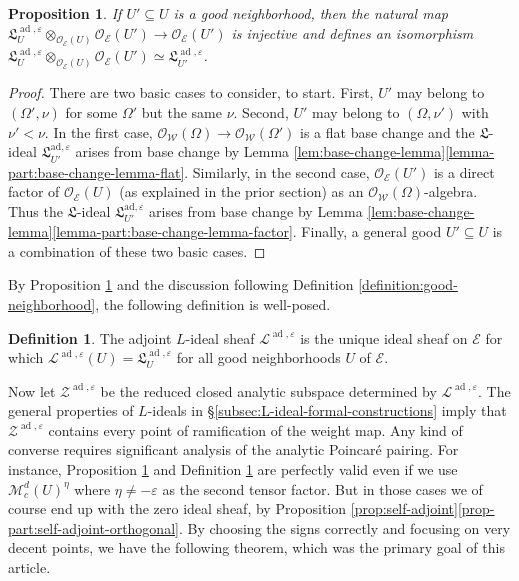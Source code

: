 \documentclass[10pt, twoside]{amsart}
\theoremstyle{plain}
\newtheorem{proposition}[theorem]{Proposition}
\theoremstyle{definition}
\newtheorem{definition}[theorem]{Definition}
\theoremstyle{remark}
\numberwithin{equation}{subsection}
\def\ad{\operatorname{ad}}
\def\gL{\mathfrak L}
\def\scro{\mathscr O}
\def\scre{\mathscr E}
\def\scrl{\mathscr L}
\def\scro{\mathscr O}
\def\scrw{\mathscr W}
\def\scrz{\mathscr{Z}}
\def\scrm{\mathscr{M}}
\begin{document}
\begin{proposition}\label{prop:base-change-Lideals}
If $U' \subseteq U$ is a good neighborhood, then the natural map $\gL_U^{\ad,\varepsilon}\otimes_{\scro_{\scre}(U)} \scro_{\scre}(U') \rightarrow \scro_{\scre}(U')$ is injective and defines an isomorphism $\gL^{\ad,\varepsilon}_U \otimes_{\scro_{\scre}(U)} \scro_{\scre}(U') \simeq \gL_{U'}^{\ad,\varepsilon}$.
\end{proposition}
\begin{proof}
There are two basic cases to consider, to start. First, $U'$ may belong to $(\Omega',\nu)$ for some $\Omega'$ but the same $\nu$. Second, $U'$ may belong to $(\Omega,\nu')$ with $\nu' < \nu$. In the first case, $\scro_{\scrw}(\Omega) \rightarrow \scro_{\scrw}(\Omega')$ is a flat base change and the $\gL$-ideal $\gL_{U'}^{\mathrm{ad},\varepsilon}$ arises from base change by Lemma \ref{lem:base-change-lemma}\ref{lemma-part:base-change-lemma-flat}. Similarly, in the second case, $\scro_{\scre}(U')$ is a direct factor of $\scro_{\scre}(U)$ (as explained in the prior section) as an $\scro_{\scrw}(\Omega)$-algebra. Thus the $\gL$-ideal $\gL_{U'}^{\mathrm{ad},\varepsilon}$ arises from base change by Lemma \ref{lem:base-change-lemma}\ref{lemma-part:base-change-lemma-factor}. Finally, a general good $U' \subseteq U$ is a combination of these two basic cases. 
\end{proof}

By Proposition \ref{prop:base-change-Lideals} and the discussion following Definition \ref{definition:good-neighborhood}, the following definition is well-posed.

\begin{definition}\label{definition:L-ideal-sheaf}
The adjoint $L$-ideal sheaf $\scrl^{\ad,\varepsilon}$ is the unique ideal sheaf on $\scre$ for which $\scrl^{\ad,\varepsilon}(U) = \gL_U^{\ad,\varepsilon}$ for all good neighborhoods $U$ of $\scre$.
\end{definition}
Now let $\scrz^{\ad,\varepsilon}$ be the reduced closed analytic subspace determined by $\scrl^{\ad,\varepsilon}$. The general properties of $L$-ideals in \S \ref{subsec:L-ideal-formal-constructions} imply that $\scrz^{\ad,\varepsilon}$ contains every point of ramification of the weight map. Any kind of converse requires significant analysis of the analytic Poincar\'e pairing. For instance, Proposition \ref{prop:base-change-Lideals} and Definition \ref{definition:L-ideal-sheaf} are perfectly valid even if we use $\scrm_c^d(U)^{\eta}$ where $\eta \neq -\varepsilon$ as the second tensor factor. But in those cases we of course end up with the zero ideal sheaf, by Proposition \ref{prop:self-adjoint}\ref{prop-part:self-adjoint-orthogonal}. By choosing the signs correctly and focusing on very decent points, we have the following theorem, which was the primary goal of this article.
\end{document}
